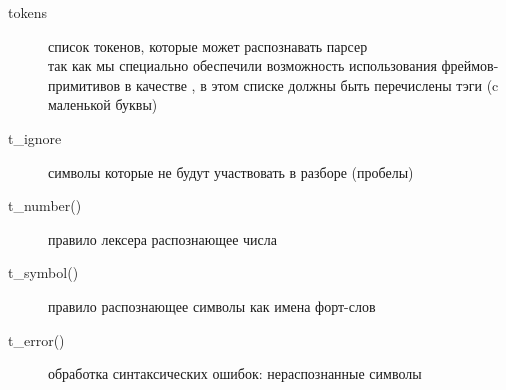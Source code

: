 \begin{description}%
\item[tokens] список токенов, которые может распознавать парсер\\
так как мы специально обеспечили возможность использования фрей\-мов-примитивов
в качестве , в этом списке должны быть перечислены тэги (c
маленькой буквы)
\item[t\_ignore] символы которые не будут участвовать в разборе (пробелы) 
\item[t\_number()] правило лексера распознающее числа
\item[t\_symbol()] правило распознающее символы как имена форт-слов
\item[t\_error()] обработка синтаксических ошибок: нераспознанные символы
\end{description}

\secup
